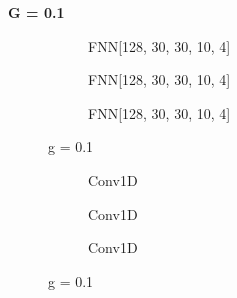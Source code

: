 \documentclass[a4paper,times,12pt]{article}
\begin{document}
\textbf{G = 0.1}

\begin{figure}[H]
    \centering
    \begin{subfigure}[t]{0.45\textwidth}
		\centering
        
        \caption{FNN[128, 30, 30, 10, 4]}
		\label{fig:a}
    \end{subfigure}\hfill
    \begin{subfigure}[t]{0.45\textwidth}
		\centering
        
        \caption{FNN[128, 30, 30, 10, 4]}
		\label{fig:b}
    \end{subfigure}\hfill    
    \begin{subfigure}[t]{0.45\textwidth}
        \centering
        
        \caption{FNN[128, 30, 30, 10, 4]}
		\label{fig:c}
    \end{subfigure}
	\caption{g = 0.1}
\end{figure}

\begin{figure}[H]
    \centering
    \begin{subfigure}[t]{0.45\textwidth}
		\centering
        
        \caption{Conv1D}
		\label{fig:a}
    \end{subfigure}\hfill
    \begin{subfigure}[t]{0.45\textwidth}
		\centering
        
        \caption{Conv1D}
		\label{fig:b}
    \end{subfigure}\hfill    
    \begin{subfigure}[t]{0.45\textwidth}
        \centering
        
        \caption{Conv1D}
		\label{fig:c}
    \end{subfigure}
	\caption{g = 0.1}
\end{figure}
\end{document}
